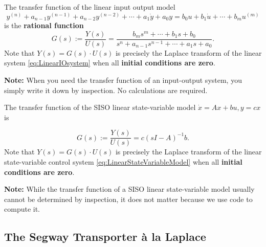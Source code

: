 \begin{tcolorbox}[colback=mylightblue, title = {\bf Transfer Function of a SISO Linear System}, breakable]

\begin{definition}
The transfer function of the linear input output model 
$$y^{(n)} + a_{n-1} y^{(n-1)} + a_{n-2} y^{(n-2)} +  \cdots +  a_1 \dot{y} + a_0 y = b_0 u + b_1 \dot{u} + \cdots + b_m u^{(m)}$$ 
is the \textbf{rational function}
\label{def:LinearIOsystemTF} 
\begin{equation}
\label{eq:LinearIOsystemTF}
G(s) := \frac{Y(s)}{U(s)} = \frac{b_m s^m + \cdots + b_1 s + b_0}{s^n + a_{n-1} s^{n-1} + \cdots + a_1 s + a_0}.
\end{equation}
Note that $Y(s) = G(s) \cdot U(s)$ is precisely the Laplace transform of the linear system \eqref{eq:LinearIOsystem} when all \textbf{initial conditions are zero}.
\end{definition}
\vspace*{.2cm}
\textbf{Note:} When you need the transfer function of an input-output system, you simply write it down by inspection. No calculations are required. 

\vspace*{.2cm}

\begin{definition}
The transfer function of the SISO linear state-variable model $\dot{x} = Ax + bu, y = cx$ is
\label{def:LinearStateVariableModelTF} 

\begin{equation}
\label{eq:LinearStateVariableModelTF}
G(s):= \frac{Y(s)}{U(s)} = c\left(sI - A\right)^{-1}  b.
\end{equation}
Note that  $Y(s) = G(s) \cdot U(s)$ is precisely the Laplace transform of the linear state-variable control system \eqref{eq:LinearStateVariableModel} when all \textbf{initial conditions are zero}.
\end{definition}
\textbf{Note:} While the transfer function of a SISO linear state-variable model usually cannot be determined by inspection, it does not matter because we use code to compute it.

\end{tcolorbox}

\vspace*{.2cm}


\vspace*{.2cm}

\subsection{The Segway Transporter \`a la Laplace}
\label{sec:LinearizedModelSegwayTransporterStateVariableAndIO}

